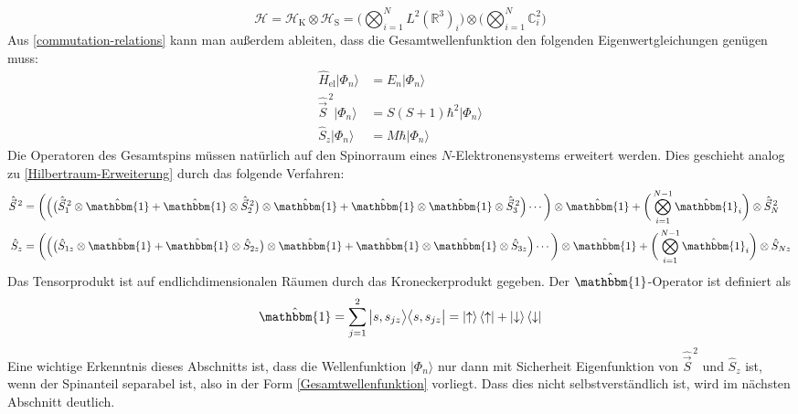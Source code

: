 \documentclass[9pt]{report}
\begin{document}
\begin{equation}
\mathcal{H}=\mathcal{H}_{\mathrm{K}}\otimes\mathcal{H}_{\mathrm{S}}=\bigg(\bigotimes_{i=1}^{N}L^{2}(\mathbb{R}^{3})_{i}\bigg)\otimes\bigg(\bigotimes_{i=1}^{N}\mathbb{C}_{i}^{2}\bigg)
\end{equation}
Aus \eqref{commutation-relations} kann man außerdem ableiten, dass die Gesamtwellenfunktion den folgenden Eigenwertgleichungen genügen muss:
\begin{align}
\hat{H}_{\mathrm{el}}|\Phi_n\rangle &= E_n |\Phi_n\rangle \\
\hat{\vec{S}}^{\,2}|\Phi_n\rangle &= S(S+1)\hbar^{2}|\Phi_n\rangle \\
\hat{S}_{z}|\Phi_n\rangle &= M\hbar|\Phi_n\rangle
\end{align}
Die Operatoren des Gesamtspins müssen natürlich auf den Spinorraum eines $N$-Elektronensystems erweitert werden. Dies geschieht analog zu \eqref{Hilbertraum-Erweiterung} durch das folgende Verfahren:
\begin{align}
\hat{\vec{S}}^{\,2} &= \bigg(\Big(\big(\hat{\vec{S}}_{1}^{\,2}\otimes\hat{\mathbbm{1}}+\hat{\mathbbm{1}}\otimes\hat{\vec{S}}_{2}^{\,2}\big)\otimes\hat{\mathbbm{1}}+\hat{\mathbbm{1}}\otimes\hat{\mathbbm{1}}\otimes\hat{\vec{S}}_{3}^{\,2}\Big)\cdots\bigg)\otimes\hat{\mathbbm{1}}+\bigg(\bigotimes_{i=1}^{N-1}\hat{\mathbbm{1}}_{i}\bigg)\otimes\hat{\vec{S}}_{N}^{\,2} \\
\hat{S}_{z} &= \bigg(\Big(\big(\hat{S}_{1z}\otimes\hat{\mathbbm{1}}+\hat{\mathbbm{1}}\otimes\hat{S}_{2z}\big)\otimes\hat{\mathbbm{1}}+\hat{\mathbbm{1}}\otimes\hat{\mathbbm{1}}\otimes\hat{S}_{3z}\Big)\cdots\bigg)\otimes\hat{\mathbbm{1}}+\bigg(\bigotimes_{i=1}^{N-1}\hat{\mathbbm{1}}_{i}\bigg)\otimes\hat{S}_{Nz}
\end{align}
Das Tensorprodukt ist auf endlichdimensionalen Räumen durch das Kroneckerprodukt gegeben. Der $\hat{\mathbbm{1}}$-Operator ist definiert als
\begin{equation}
\hat{\mathbbm{1}}=\sum_{j=1}^{2}\big|s,s_{jz}\big\rangle\big\langle s,s_{jz}\big|=\left|\uparrow\right\rangle\langle\left\uparrow\right|+\left|\downarrow\right\rangle\langle\left\downarrow\right|
\end{equation}
Eine wichtige Erkenntnis dieses Abschnitts ist, dass die Wellenfunktion $|\Phi_n\rangle$ nur dann mit Sicherheit Eigenfunktion von $\hat{\vec{S}}^{\,2}$ und $\hat{S}_{z}$ ist, wenn der Spinanteil separabel ist, also in der Form \eqref{Gesamtwellenfunktion} vorliegt. Dass dies nicht selbstverständlich ist, wird im nächsten Abschnitt deutlich.
\end{document}
